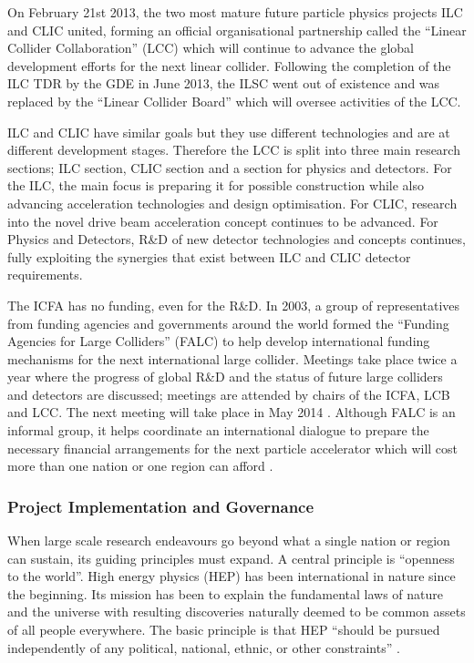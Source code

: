 On February 21st 2013, the two most mature future particle physics projects \textendash ILC and CLIC \textendash united, forming an official organisational partnership called the ``Linear Collider Collaboration'' (LCC) which will continue to advance the global development efforts for the next linear collider. \cite{LCC:Press1} Following the completion of the ILC TDR by the GDE in June 2013, the ILSC went out of existence and was replaced by the ``Linear Collider Board'' which will oversee activities of the LCC.

ILC and CLIC have similar goals but they use different technologies and are at different development stages. Therefore the LCC is split into three main research sections; ILC section, CLIC section and a section for physics and detectors. For the ILC, the main focus is preparing it for possible construction while also advancing acceleration technologies and design optimisation. For CLIC, research into the novel drive beam acceleration concept continues to be advanced.  For Physics and Detectors, R\&D of new detector technologies and concepts continues, fully exploiting the synergies that exist between ILC and CLIC detector requirements. \cite{LCC:Press1}

The ICFA has no funding, even for the R\&D. In 2003, a group of representatives from funding agencies and governments around the world formed the ``Funding Agencies for Large Colliders'' (FALC) to help develop international funding mechanisms for the next international large collider. Meetings take place twice a year where the progress of global R\&D and the status of future large colliders and detectors are discussed; meetings are attended by chairs of the ICFA, LCB and LCC. The next meeting will take place in May 2014 \cite{Funding:FALC:History}. Although FALC is an informal group, it helps coordinate an international dialogue to prepare the necessary financial arrangements for the next particle accelerator which will cost more than one nation or one region can afford \cite{Funding:FALC:Report}.

\subsubsection{Project Implementation and Governance}

When large scale research endeavours go beyond what a single nation or region can sustain, its guiding principles must expand. A central principle is ``openness to the world''. High energy physics (HEP) has been international in nature since the beginning. Its mission has been to explain the fundamental laws of nature and the universe with resulting discoveries naturally deemed to be common assets of all people everywhere. The basic principle is that HEP ``should be pursued independently of any political, national, ethnic, or other constraints'' \cite{ILC:PIPReport}.

